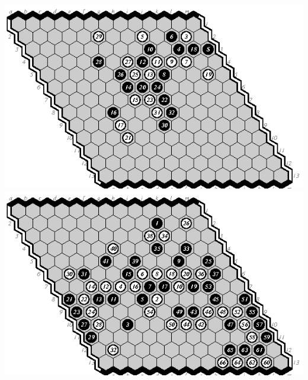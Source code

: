 \documentclass{icga}
\begin{document}
\includegraphics[scale=1.3]{13.05e-d.swap.eps}\hspace*{-2.5cm}\includegraphics[scale=1.3]{13.06d-m.eps}
\end{document}
